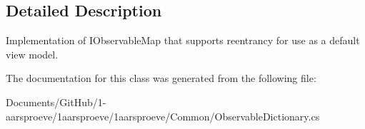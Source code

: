 \subsection{Detailed Description}
Implementation of I\+Observable\+Map that supports reentrancy for use as a default view model. 



The documentation for this class was generated from the following file\+:\begin{DoxyCompactItemize}
\item 
Documents/\+Git\+Hub/1-\/aarsproeve/1aarsproeve/1aarsproeve/\+Common/Observable\+Dictionary.\+cs\end{DoxyCompactItemize}
